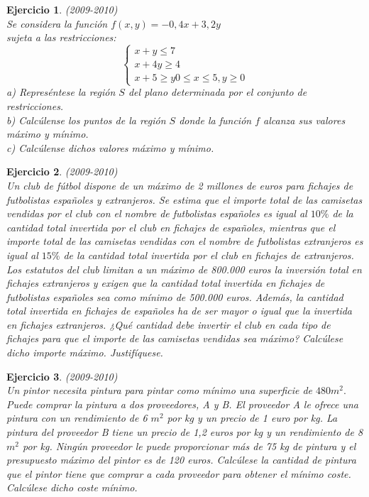 \documentclass[12pt, a4paper]{amsart}
\newtheorem{ejer}{Ejercicio}
\begin{document}
\begin{ejer}\em (2009-2010)\\
Se considera la función $f(x,y)=-0,4x+3,2y$\\
sujeta a las restricciones: \[\left \{ \begin{matrix}
x+y\leq 7
\\ x+4y\geq 4
\\ x+5\geq y
0\leq x\leq 5, y\geq 0
\end{matrix}\right.\]
a) Represéntese la región $S$ del plano determinada por el conjunto de restricciones.\\
b) Calcúlense los puntos de la región $S$ donde la función $f$ alcanza sus valores máximo y mínimo.\\
c) Calcúlense dichos valores máximo y mínimo.
\end{ejer}

\begin{ejer}\em  (2009-2010)\\
Un club de fútbol dispone de un máximo de 2 millones de euros para fichajes de futbolistas españoles y extranjeros. Se estima que el importe total de las camisetas vendidas por el club con el nombre de futbolistas españoles es igual al $10\%$ de la cantidad total invertida por el club en fichajes de españoles, mientras que el importe total de las camisetas vendidas con el nombre de futbolistas extranjeros es igual al $15\%$ de la cantidad total invertida por el club en fichajes de extranjeros. Los estatutos del club limitan a un máximo de 800.000 euros la inversión total en fichajes extranjeros y exigen que la cantidad total invertida en fichajes de futbolistas españoles sea como mínimo de 500.000 euros. Además, la cantidad total invertida en fichajes de españoles ha de ser mayor o igual que la invertida en fichajes extranjeros. ¿Qué cantidad debe invertir el club en cada tipo de fichajes para que el importe de las camisetas vendidas sea máximo? Calcúlese dicho importe máximo. Justifíquese.
\end{ejer}

\begin{ejer}\em  (2009-2010)\\
Un pintor necesita pintura para pintar como mínimo una superficie de $480 m^2.$ Puede comprar la pintura a dos proveedores, A y B. El proveedor A le ofrece una pintura con un rendimiento de 6 $m^2$ por kg y un precio de 1 euro por kg. La pintura del proveedor B tiene un precio de 1,2 euros por kg y un rendimiento de 8 $m^2$ por kg. Ningún proveedor le puede proporcionar más de 75 kg de pintura y el presupuesto máximo del pintor es de 120 euros. Calcúlese la cantidad de pintura que el pintor tiene que comprar a cada proveedor para obtener el mínimo coste. Calcúlese dicho coste mínimo. 
\end{ejer}
\end{document}
